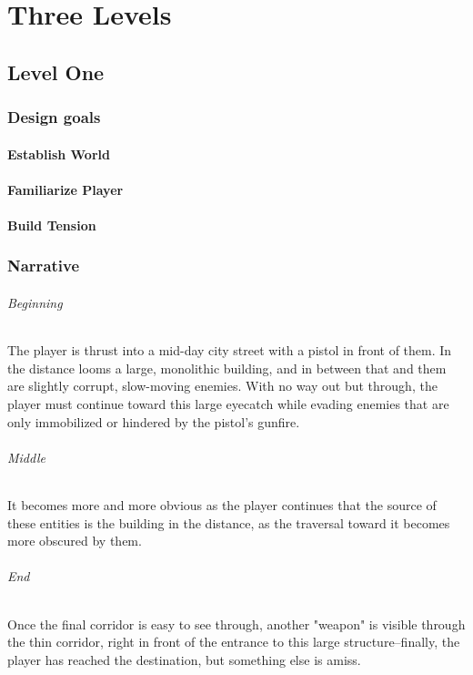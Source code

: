 \documentclass[letterpaper]{report}
\begin{document}
\part{Three Levels}
	\chapter{Level One}
		\section{Design goals}
			\subsection{Establish World}
			\subsection{Familiarize Player}
			\subsection{Build Tension}
		\section{Narrative}
			\paragraph{Beginning} The player is thrust into a mid-day city street with a pistol in front of them. In the distance looms a large, monolithic building, and in between that and them are slightly corrupt, slow-moving enemies. With no way out but through, the player must continue toward this large eyecatch while evading enemies that are only immobilized or hindered by the pistol's gunfire.
			\paragraph{Middle} It becomes more and more obvious as the player continues that the source of these entities is the building in the distance, as the traversal toward it becomes more obscured by them.
			\paragraph{End} Once the final corridor is easy to see through, another "weapon" is visible through the thin corridor, right in front of the entrance to this large structure--finally, the player has reached the destination, but something else is amiss.
			
\end{document}
